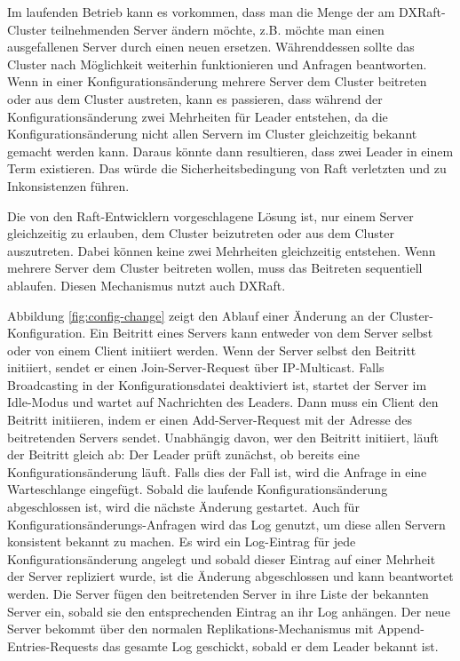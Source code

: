 Im laufenden Betrieb kann es vorkommen, dass man die Menge der am DXRaft-Cluster teilnehmenden Server ändern möchte, z.B. möchte man einen ausgefallenen Server durch einen neuen ersetzen. Währenddessen sollte das Cluster nach Möglichkeit weiterhin funktionieren und Anfragen beantworten. Wenn in einer Konfigurationsänderung mehrere Server dem Cluster beitreten oder aus dem Cluster austreten, kann es passieren, dass während der Konfigurationsänderung zwei Mehrheiten für Leader entstehen, da die Konfigurationsänderung nicht allen Servern im Cluster gleichzeitig bekannt gemacht werden kann. Daraus könnte dann resultieren, dass zwei Leader in einem Term existieren. Das würde die Sicherheitsbedingung von Raft verletzten und zu Inkonsistenzen führen.

Die von den Raft-Entwicklern vorgeschlagene Lösung ist, nur einem Server gleichzeitig zu erlauben, dem Cluster beizutreten oder aus dem Cluster auszutreten. Dabei können keine zwei Mehrheiten gleichzeitig entstehen. Wenn mehrere Server dem Cluster beitreten wollen, muss das Beitreten sequentiell ablaufen. Diesen Mechanismus nutzt auch DXRaft.

Abbildung \ref{fig:config-change} zeigt den Ablauf einer Änderung an der Cluster-Konfiguration. Ein Beitritt eines Servers kann entweder von dem Server selbst oder von einem Client initiiert werden. Wenn der Server selbst den Beitritt initiiert, sendet er einen Join-Server-Request über IP-Multicast. Falls Broadcasting in der Konfigurationsdatei deaktiviert ist, startet der Server im Idle-Modus und wartet auf Nachrichten des Leaders. Dann muss ein Client den Beitritt initiieren, indem er einen Add-Server-Request mit der Adresse des beitretenden Servers sendet. Unabhängig davon, wer den Beitritt initiiert, läuft der Beitritt gleich ab: Der Leader prüft zunächst, ob bereits eine Konfigurationsänderung läuft. Falls dies der Fall ist, wird die Anfrage in eine Warteschlange eingefügt. Sobald die laufende Konfigurationsänderung abgeschlossen ist, wird die nächste Änderung gestartet. Auch für Konfigurationsänderungs-Anfragen wird das Log genutzt, um diese allen Servern konsistent bekannt zu machen. Es wird ein Log-Eintrag für jede Konfigurationsänderung angelegt und sobald dieser Eintrag auf einer Mehrheit der Server repliziert wurde, ist die Änderung abgeschlossen und kann beantwortet werden. Die Server fügen den beitretenden Server in ihre Liste der bekannten Server ein, sobald sie den entsprechenden Eintrag an ihr Log anhängen. Der neue Server bekommt über den normalen Replikations-Mechanismus mit Append-Entries-Requests das gesamte Log geschickt, sobald er dem Leader bekannt ist.

